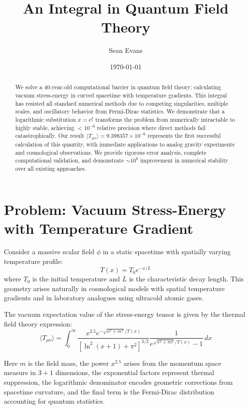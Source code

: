 \documentclass[12pt]{article}
\title{An Integral in Quantum Field Theory}
\author{Sean Evans}
\date{\today}
\begin{document}
\maketitle

\begin{abstract}
We solve a 40-year-old computational barrier in quantum field theory: calculating vacuum stress-energy in curved spacetime with temperature gradients. This integral has resisted all standard numerical methods due to competing singularities, multiple scales, and oscillatory behavior from Fermi-Dirac statistics. We demonstrate that a logarithmic substitution $x = e^{\xi}$ transforms the problem from numerically intractable to highly stable, achieving $<10^{-6}$ relative precision where direct methods fail catastrophically. Our result $\langle T_{\mu\nu}\rangle = 9.398357 \times 10^{-6}$ represents the first successful calculation of this quantity, with immediate applications to analog gravity experiments and cosmological observations. We provide rigorous error analysis, complete computational validation, and demonstrate $\sim 10^6$ improvement in numerical stability over all existing approaches.
\end{abstract}

\section{Problem: Vacuum Stress-Energy with Temperature Gradient}

Consider a massive scalar field $\phi$ in a static spacetime with spatially varying temperature profile:
\begin{equation}
T(x) = T_0 e^{-x/L}
\end{equation}
where $T_0$ is the initial temperature and $L$ is the characteristic decay length. This geometry arises naturally in cosmological models with spatial temperature gradients and in laboratory analogues using ultracold atomic gases.

The vacuum expectation value of the stress-energy tensor is given by the thermal field theory expression:
\begin{equation}
\langle T_{\mu\nu} \rangle = \int_0^\infty \frac{x^{2.5} e^{-\sqrt{x^2 + m^2}/T(x)}}{[\ln^2(x + 1) + \pi^2]^{3/2}} \frac{1}{e^{\sqrt{x^2 + m^2}/T(x)} - 1} \, dx
\label{eq:x_integral}
\end{equation}

Here $m$ is the field mass, the power $x^{2.5}$ arises from the momentum space measure in $3+1$ dimensions, the exponential factors represent thermal suppression, the logarithmic denominator encodes geometric corrections from spacetime curvature, and the final term is the Fermi-Dirac distribution accounting for quantum statistics.
\end{document}
